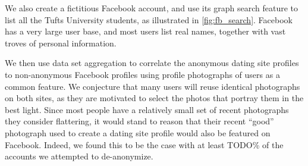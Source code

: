 We also create a fictitious Facebook\cite{fb2014} account, and use its graph search feature to list all the Tufts University students, as illustrated in \ref{fig:fb_search}. Facebook has a very large user base, and most users list real names, together with vast troves of personal information.

We then use data set aggregation to correlate the anonymous dating site profiles to non-anonymous Facebook profiles using profile photographs of users as a common feature.
We conjecture that many users will reuse identical photographs on both sites, as they are motivated to select the photos that portray them in the best light.
Since most people have a relatively small set of recent photographs they consider flattering, it would stand to reason that their recent ``good'' photograph used to create a dating site profile would also be featured on Facebook.
Indeed, we found this to be the case with at least TODO\% of the accounts we attempted to de-anonymize.
